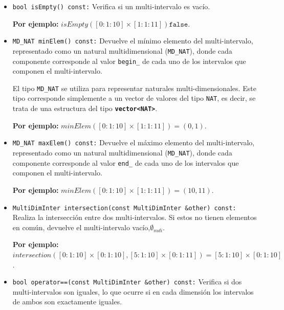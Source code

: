 \begin{itemize}
    \item \texttt{bool isEmpty() const:}  
    Verifica si un multi-intervalo es vacío.

    \begin{center}
    \textbf{Por ejemplo:} $isEmpty([0:1:10] \times [1:1:11]) \texttt{false}$.
    \end{center}

    \item \texttt{MD\_NAT minElem() const:}  
    Devuelve el mínimo elemento del multi-intervalo, representado como un natural multidimensional (\texttt{MD\_NAT}), donde cada componente corresponde al valor \texttt{begin\_} de cada uno de los intervalos que componen el multi-intervalo.

    El tipo \texttt{MD\_NAT} se utiliza para representar naturales multi-dimensionales. Este tipo corresponde simplemente a un vector de valores del tipo \texttt{NAT}, es decir, se trata de una estructura del tipo \textbf{\texttt{vector<NAT>}}.
    
    \begin{center}
    \textbf{Por ejemplo:} $minElem([0:1:10] \times [1:1:11])=(0, 1)$.
    \end{center}

    \item \texttt{MD\_NAT maxElem() const:}  
    Devuelve el máximo elemento del multi-intervalo, representado como un natural multidimensional (\texttt{MD\_NAT}), donde cada componente corresponde al valor \texttt{end\_} de cada uno de los intervalos que componen el multi-intervalo.
    
    \begin{center}
    \textbf{Por ejemplo:} $minElem([0:1:10] \times [1:1:11])=(10, 11)$.
    \end{center}

    
    \item \texttt{MultiDimInter intersection(const MultiDimInter \&other) const:}  
    Realiza la intersección entre dos multi-intervalos. Si estos no tienen elementos en común, devuelve el multi-intervalo vacío,$\emptyset_{mdi}$.

     \begin{center}
        \textbf{Por ejemplo:} $intersection([0: 1: 10] \times [0: 1: 10],[5: 1: 10] \times [0: 1: 11]) = [5: 1: 10] \times [0: 1: 10]$.
    \end{center}

    \item \texttt{bool operator==(const MultiDimInter \&other) const:}  
    Verifica si dos multi-intervalos son iguales, lo que ocurre si en cada dimensión los intervalos de ambos son exactamente iguales.


\end{itemize}

